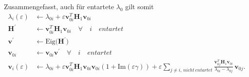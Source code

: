 
Zusammengefasst, auch für entartete $\lambda_0$ gilt somit
\begin{align*}
    \lambda_i(\varepsilon)
    & \gets
    \lambda_{0i} + \varepsilon \bm v_{0i}^T \bm H_1 \bm v_{0i}\\
    \bm H^\prime & \gets \bm v_{0i}^T \bm H_1 \bm v_{0i} \quad \forall \quad i \quad entartet \\
    \bm v^\prime & \gets \mathrm{Eig} \Big( \bm H^\prime \Big) \\
    \bm v_{0i} & \gets \bm v_{0i} \bm v^\prime  \quad \forall \quad i \quad entartet \\
    \bm v_i(\varepsilon)
    & \gets
    \lambda_{0i} + \varepsilon \bm v_{0i}^T \bm H_1 \bm v_{0i}
        \bm v_{0i} ( 1 + \mathrm{Im}(\varepsilon \gamma) ) + \varepsilon \sum_{j \neq i, \,nicht\,entartet}
        \frac{\bm v_{0j}^T \bm H_1 \bm v_{0i}}{\lambda_{0i} - \lambda_{0j}}
        \, \bm v_{0j}.
\end{align*}
